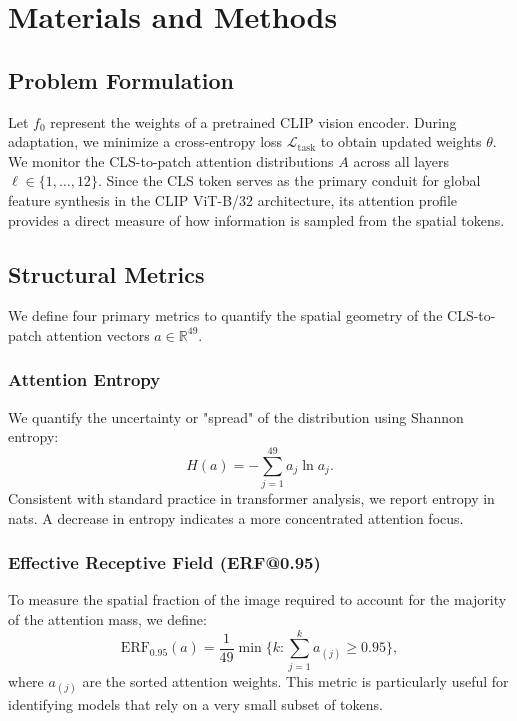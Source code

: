 \documentclass[ai,article,submit,pdftex,oneauthor]{Definitions/mdpi}
\begin{document}
\section{Materials and Methods}
\subsection{Problem Formulation}
Let $f_0$ represent the weights of a pretrained CLIP vision encoder. During adaptation, we minimize a cross-entropy loss $\mathcal{L}_{\mathrm{task}}$ to obtain updated weights $\theta$. We monitor the CLS-to-patch attention distributions $A$ across all layers $\ell \in \{1, \dots, 12\}$. Since the CLS token serves as the primary conduit for global feature synthesis in the CLIP ViT-B/32 architecture, its attention profile provides a direct measure of how information is sampled from the spatial tokens.

\subsection{Structural Metrics}
We define four primary metrics to quantify the spatial geometry of the CLS-to-patch attention vectors $a \in \mathbb{R}^{49}$.

\subsubsection{Attention Entropy}
We quantify the uncertainty or "spread" of the distribution using Shannon entropy:
\begin{equation}
H(a) = -\sum_{j=1}^{49} a_j \ln a_j.
\end{equation}
Consistent with standard practice in transformer analysis, we report entropy in nats. A decrease in entropy indicates a more concentrated attention focus.

\subsubsection{Effective Receptive Field (ERF@0.95)}
To measure the spatial fraction of the image required to account for the majority of the attention mass, we define:
\begin{equation}
\mathrm{ERF}_{0.95}(a) = \frac{1}{49} \min\Big\{k : \sum_{j=1}^{k} a_{(j)} \geq 0.95\Big\},
\end{equation}
where $a_{(j)}$ are the sorted attention weights. This metric is particularly useful for identifying models that rely on a very small subset of tokens.
\end{document}
